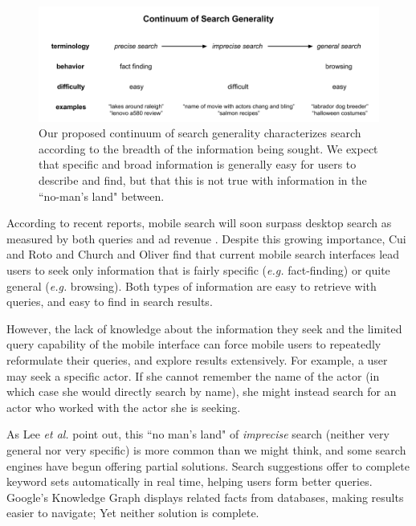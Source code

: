 \begin{figure}[ht]
\centering
\includegraphics[width=\textwidth]{images/terminologydiagram}
\caption{ Our proposed continuum of search generality characterizes search according to the breadth of the information being sought. We expect that specific and broad information is generally easy for users to describe and find, but that this is not true with information in the ``no-man's land" between.}
\label{fig:searchcontinuum}
\end{figure}




According to recent reports, mobile search will soon surpass desktop search as measured by both queries and ad revenue \cite{MobileQueries}\cite{MobileRevenue}. Despite this growing importance, Cui and Roto \cite{Cui:2008} and Church and Oliver \cite{Church:2011} find that current mobile search interfaces lead users to seek only information that is fairly specific (\textit{e.g.} fact-finding) or quite general (\textit{e.g.} browsing). Both types of information are easy to retrieve with queries, and easy to find in search results.

However, the lack of knowledge about the information they seek and the limited query capability of the mobile interface \cite{Kamvar:2009} can force mobile users to repeatedly reformulate their queries, and explore results extensively. For example, a user may seek a specific actor. If she cannot remember the name of the actor (in which case she would directly search by name), she might instead search for an actor who worked with the actor she is seeking. 

As Lee \textit{et al.} \cite{Lee:2012} point out, this ``no man's land" of \textit{imprecise} search (neither very general nor very specific) is more common than we might think, and some search engines have begun offering partial solutions. Search suggestions offer to complete keyword sets automatically in real time, helping users form better queries. Google's Knowledge Graph \cite{GoogleKnowledgeGraph} displays related facts from databases, making results easier to navigate; Yet neither solution is complete.

